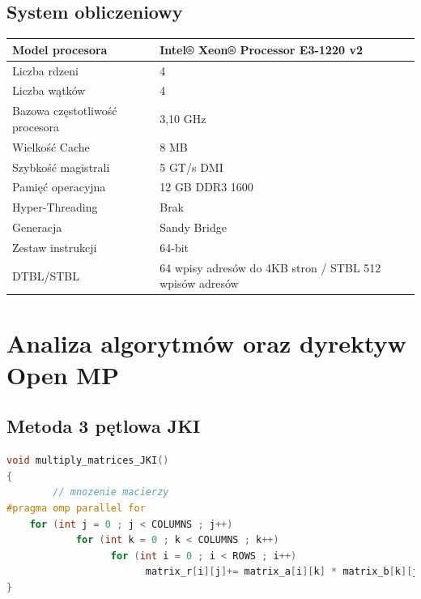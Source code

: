 \documentclass{scrartcl}
\begin{document}
\subsection{System obliczeniowy}
\begin{table}[H]
\begin{tabular}{|l|l|}
\hline
Model procesora                & Intel® Xeon® Processor E3-1220 v2                       \\ \hline
Liczba rdzeni                  & 4                                                       \\ \hline
Liczba wątków                  & 4                                                       \\ \hline
Bazowa częstotliwość procesora & 3,10 GHz                                                \\ \hline
Wielkość Cache                 & 8 MB                                                    \\ \hline
Szybkość magistrali            & 5 GT/s DMI                                              \\ \hline
Pamięć operacyjna              & 12 GB DDR3 1600                                         \\ \hline
Hyper-Threading                & Brak                                                    \\ \hline
Generacja                      & Sandy Bridge                                            \\ \hline
Zestaw instrukcji              & 64-bit                                                  \\ \hline
DTBL/STBL                      & 64 wpisy adresów do 4KB stron / STBL 512 wpisów adresów \\ \hline
\end{tabular}
\end{table}
\newpage 
\section{Analiza algorytmów oraz dyrektyw Open MP}
\subsection{Metoda 3 pętlowa JKI}
\begin{lstlisting}[language=C++, caption={Metoda trzypętlowa}]
void multiply_matrices_JKI()
{
        // mnozenie macierzy 
#pragma omp parallel for 
	for (int j = 0 ; j < COLUMNS ; j++)
      	    for (int k = 0 ; k < COLUMNS ; k++) 
                  for (int i = 0 ; i < ROWS ; i++) 
                        matrix_r[i][j]+= matrix_a[i][k] * matrix_b[k][j] ;              
}
\end{lstlisting}
\end{document}
